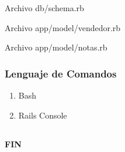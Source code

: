 \documentclass{beamer}
\begin{document}
\begin{frame}
Archivo db/schema.rb

\end{frame}

\begin{frame}
Archivo app/model/vendedor.rb

\end{frame}

\begin{frame}
Archivo app/model/notas.rb

\end{frame}

\begin{frame}
\frametitle{Lenguaje de Comandos}
\begin{enumerate}
\item Bash \pause
\item Rails Console
\end{enumerate}
\end{frame}

\subsection{}
\begin{frame}
\begin{center}
\huge{\textbf{FIN}}
\end{center}
\end{frame}
\end{document}
